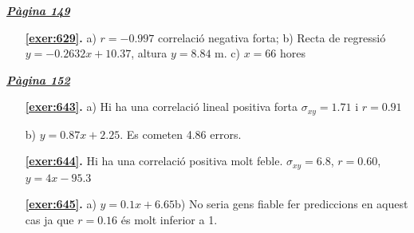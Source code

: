 
\hyperlink{page.149}{\textbf{\em Pàgina 149}}
\begin{enumerate}
\item[\fontfamily{phv}\selectfont\color{blue}\textbf{\ref{exer:629}. }] \label{ans:629} 
a) $r=-0.997$ correlació negativa forta; \quad b) Recta de regressió $y=-0.2632 x+10.37$, altura $y=8.84$ m. \quad c) $x=66$ hores
 \end{enumerate}
\vspace{0.3cm}


\hyperlink{page.152}{\textbf{\em Pàgina 152}}
\begin{enumerate}
\item[\fontfamily{phv}\selectfont\color{blue}\textbf{\ref{exer:643}. }] \label{ans:643} 
a) Hi ha una correlació lineal positiva forta $\sigma _{xy}=1.71$ i $r=0.91$\par b) $y=0.87x+2.25$. Es cometen 4.86 errors.
 \end{enumerate}
\begin{enumerate}
\item[\fontfamily{phv}\selectfont\color{blue}\textbf{\ref{exer:644}. }] \label{ans:644} 
Hi ha una correlació positiva molt feble. $\sigma _{xy}=6.8$, $r=0.60$, $y=4x-95.3$
\item[\fontfamily{phv}\selectfont\color{blue}\textbf{\ref{exer:645}. }] \label{ans:645} 
a) $y=0.1x+6.65$\quad b) No seria gens fiable fer prediccions en aquest cas ja que $r=0.16$ és molt inferior a 1.
 \end{enumerate}